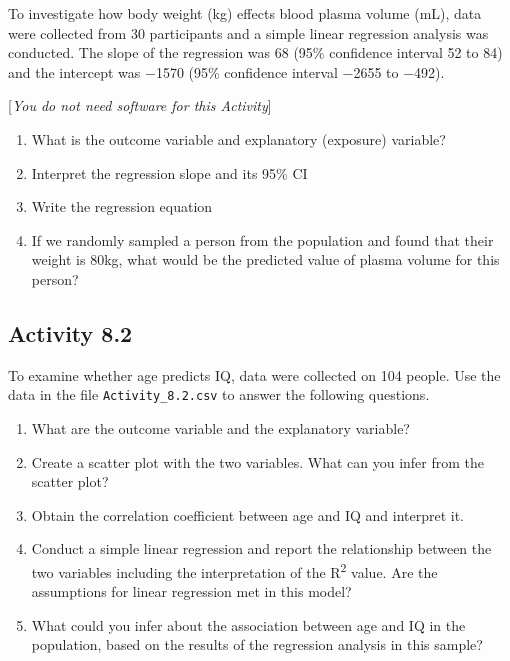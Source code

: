 \documentclass[
]{memoir}
\providecommand{\tightlist}{%
  \setlength{\itemsep}{0pt}\setlength{\parskip}{0pt}}
\begin{document}
To investigate how body weight (kg) effects blood plasma volume (mL), data were collected from 30 participants and a simple linear regression analysis was conducted. The slope of the regression was 68 (95\% confidence interval 52 to 84) and the intercept was −1570 (95\% confidence interval −2655 to −492).

{[}\emph{You do not need software for this Activity}{]}

\begin{enumerate}
\def\labelenumi{\alph{enumi})}
\tightlist
\item
  What is the outcome variable and explanatory (exposure) variable?
\item
  Interpret the regression slope and its 95\% CI
\item
  Write the regression equation
\item
  If we randomly sampled a person from the population and found that their weight is 80kg, what would be the predicted value of plasma volume for this person?
\end{enumerate}

\hypertarget{activity-8.2}{%
\subsection*{Activity 8.2}\label{activity-8.2}}

To examine whether age predicts IQ, data were collected on 104 people. Use the data in the file \texttt{Activity\_8.2.csv} to answer the following questions.

\begin{enumerate}
\def\labelenumi{\alph{enumi})}
\tightlist
\item
  What are the outcome variable and the explanatory variable?
\item
  Create a scatter plot with the two variables. What can you infer from the scatter plot?
\item
  Obtain the correlation coefficient between age and IQ and interpret it.
\item
  Conduct a simple linear regression and report the relationship between the two variables including the interpretation of the R\textsuperscript{2} value. Are the assumptions for linear regression met in this model?
\item
  What could you infer about the association between age and IQ in the population, based on the results of the regression analysis in this sample?
\end{enumerate}
\end{document}
